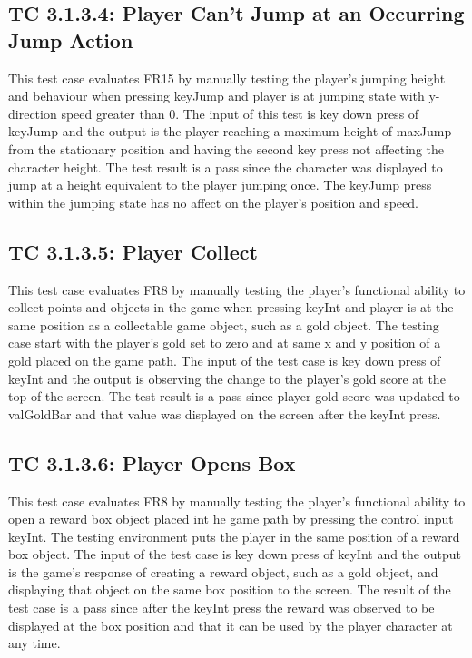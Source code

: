 \documentclass[12pt, titlepage]{article}
\begin{document}
\subsection*{TC 3.1.3.4: Player Can't Jump at an Occurring Jump Action}
This test case evaluates FR15 by manually testing the player's jumping height and behaviour when pressing keyJump and player is at jumping state with y-direction speed greater than 0. The input of this test is key down press of keyJump and the output is the player reaching a maximum height of maxJump from the stationary position and having the second key press not affecting the character height. The test result is a pass since the character was displayed to jump at a height equivalent to the player jumping once. The keyJump press within the jumping state has no affect on the player's position and speed. 

\subsection*{TC 3.1.3.5: Player Collect}
This test case evaluates FR8 by manually testing the player's functional ability to collect points and objects in the game when pressing keyInt and player is at the same position as a collectable game object, such as a gold object. The testing case start with the player's gold set to zero and at same x and y position of a gold placed on the game path. The input of the test case is key down press of keyInt and the output is observing the change to the player's gold score at the top of the screen. The test result is a pass since player gold score was updated to valGoldBar and that value was displayed on the screen after the keyInt press.  

\subsection*{TC 3.1.3.6: Player Opens Box}
This test case evaluates FR8 by manually testing the player's functional ability to open a reward box object placed int he game path by pressing the control input keyInt. The testing environment puts the player in the same position of a reward box object. The input of the test case is key down press of keyInt and the output is the game's response of creating a reward object, such as a gold object, and displaying that object on the same box position to the screen. The result of the test case is a pass since after the keyInt press the reward was observed to be displayed at the box position and that it can be used by the player character at any time. 
\end{document}
